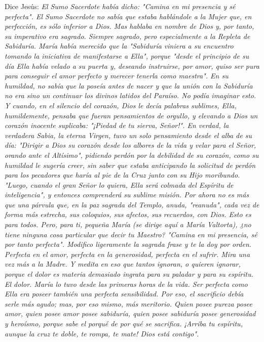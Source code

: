 \documentclass[12pt]{book} %
\begin{document}
Dice Jesús: 
\emph{El Sumo Sacerdote había dicho: "Camina en mi presencia y sé perfecta". El Sumo Sacerdote no sabía que estaba hablándole a la Mujer que, en perfección, es sólo inferior a Dios. Mas hablaba en nombre de Dios y, por tanto, su imperativo era sagrado. Siempre sagrado, pero especialmente a la Repleta de Sabiduría. María había merecido que la "Sabiduría viniera a su encuentro tomando la iniciativa de manifestarse a Ella", porque "desde el principio de su día Ella había velado a su puerta y, deseando instruirse, por amor, quiso ser pura para conseguir el amor perfecto y merecer tenerla como maestra". En su humildad, no sabía que la poseía antes de nacer y que la unión con la Sabiduría no era sino un continuar los divinos latidos del Paraíso. No podía imaginar esto. Y cuando, en el silencio del corazón, Dios le decía palabras sublimes, Ella, humildemente, pensaba que fueran pensamientos de orgullo, y elevando a Dios un corazón inocente suplicaba: "¡Piedad de tu sierva, Señor!". En verdad, la verdadera Sabia, la eterna Virgen, tuvo un solo pensamiento desde el alba de su día: "Dirigir a Dios su corazón desde los albores de la vida y velar para el Señor, orando ante el Altísimo", pidiendo perdón por la debilidad de su corazón, como su humildad le sugería creer, sin saber que estaba anticipando la solicitud de perdón para los pecadores que haría al pie de la Cruz junto con su Hijo moribundo. "Luego, cuando el gran Señor lo quiera, Ella será colmada del Espíritu de inteligencia", y entonces comprenderá su sublime misión. Por ahora no es más que una párvula que, en la paz sagrada del Templo, anuda, "reanuda", cada vez de forma más estrecha, sus coloquios, sus afectos, sus recuerdos, con Dios. Esto es para todos. Pero, para ti, pequeña María (se dirige aquí a María Valtorta), ¿no tiene ninguna cosa particular que decir tu Maestro? "Camina en mi presencia, sé por tanto perfecta". Modifico ligeramente la sagrada frase y te la doy por orden. Perfecta en el amor, perfecta en la generosidad, perfecta en el sufrir. Mira una vez más a la Madre. Y medita en eso que tantos ignoran, o quieren ignorar, porque el dolor es materia demasiado ingrata para su paladar y para su espíritu. El dolor. María lo tuvo desde las primeras horas de la vida. Ser perfecta como Ella era poseer también una perfecta sensibilidad. Por eso, el sacrificio debía serle más agudo; mas, por eso mismo, más meritorio. Quien posee pureza posee amor, quien posee amor posee sabiduría, quien posee sabiduría posee generosidad y heroísmo, porque sabe el porqué de por qué se sacrifica. ¡Arriba tu espíritu, aunque la cruz te doble, te rompa, te mate! Dios está contigo". }
 
\end{document}
